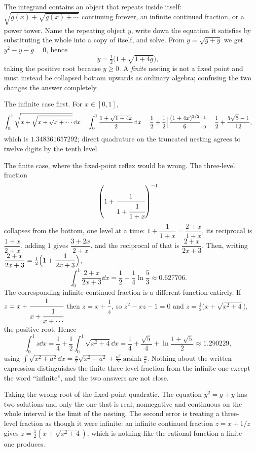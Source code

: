 \cue The integrand contains an object that repeats inside itself: $\sqrt{g(x)+\sqrt{g(x)+\cdots}}$ continuing forever, an infinite continued fraction, or a power tower.
\method Name the repeating object $y$, write down the equation it satisfies by substituting the whole into a copy of itself, and solve. From $y=\sqrt{g+y}$ we get $y^2-y-g=0$, hence
\[
y=\tfrac12\bigl(1+\sqrt{1+4g}\bigr),
\]
taking the positive root because $y\geq0$. A \emph{finite} nesting is not a fixed point and must instead be collapsed bottom upwards as ordinary algebra; confusing the two changes the answer completely.

\begin{worked}
The infinite case first. For $x\in[0,1]$,
\[
\int_0^1\sqrt{x+\sqrt{x+\sqrt{x+\cdots}}}\,\mathrm{d} x=\int_0^1\frac{1+\sqrt{1+4x}}{2}\,\mathrm{d} x=\frac12+\frac12\Bigl[\frac{(1+4x)^{3/2}}{6}\Bigr]_0^1=\frac12+\frac{5\sqrt5-1}{12},
\]
which is $1.348361657292$; direct quadrature on the truncated nesting agrees to twelve digits by the tenth level.

The finite case, where the fixed-point reflex would be wrong. The three-level fraction
\[
\left(1+\cfrac{1}{1+\cfrac{1}{1+x}}\right)^{-1}
\]
collapses from the bottom, one level at a time: $1+\dfrac{1}{1+x}=\dfrac{2+x}{1+x}$, its reciprocal is $\dfrac{1+x}{2+x}$, adding $1$ gives $\dfrac{3+2x}{2+x}$, and the reciprocal of that is $\dfrac{2+x}{2x+3}$. Then, writing $\dfrac{2+x}{2x+3}=\tfrac12\Bigl(1+\dfrac{1}{2x+3}\Bigr)$,
\[
\int_0^1\frac{2+x}{2x+3}\dd x=\frac12+\frac14\ln\frac53\approx0.627706 .
\]
The corresponding infinite continued fraction is a different function entirely. If $z=x+\cfrac{1}{x+\cfrac{1}{x+\cdots}}$ then $z=x+\dfrac1z$, so $z^2-xz-1=0$ and $z=\tfrac12\bigl(x+\sqrt{x^2+4}\bigr)$, the positive root. Hence
\[
\int_0^1 z\dd x=\frac14+\frac12\int_0^1\sqrt{x^2+4}\dd x=\frac14+\frac{\sqrt5}{4}+\ln\frac{1+\sqrt5}{2}\approx1.290229 ,
\]
using $\int\sqrt{x^2+a^2}\dd x=\tfrac{x}{2}\sqrt{x^2+a^2}+\tfrac{a^2}{2}\operatorname{arsinh}\tfrac xa$. Nothing about the written expression distinguishes the finite three-level fraction from the infinite one except the word ``infinite'', and the two answers are not close.
\end{worked}

\begin{trap}
Taking the wrong root of the fixed-point quadratic. The equation $y^2=g+y$ has two solutions and only the one that is real, nonnegative and continuous on the whole interval is the limit of the nesting. The second error is treating a three-level fraction as though it were infinite: an infinite continued fraction $z=x+1/z$ gives $z=\tfrac12(x+\sqrt{x^2+4})$, which is nothing like the rational function a finite one produces.
\end{trap}

